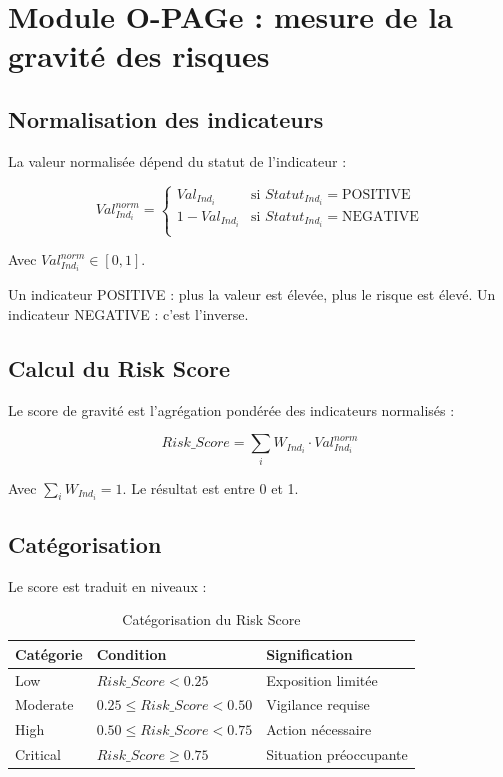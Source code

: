 \section{Module O-PAGe : mesure de la gravité des risques}

\subsection{Normalisation des indicateurs}
La valeur normalisée dépend du statut de l'indicateur :

$$
Val^{norm}_{Ind_i} = \begin{cases}
Val_{Ind_i} & \text{si } Statut_{Ind_i} = \text{POSITIVE} \\
1 - Val_{Ind_i} & \text{si } Statut_{Ind_i} = \text{NEGATIVE} \\
\end{cases}
$$

Avec $Val^{norm}_{Ind_i} \in [0, 1]$.

Un indicateur POSITIVE : plus la valeur est élevée, plus le risque est élevé. Un indicateur NEGATIVE : c'est l'inverse.

\subsection{Calcul du Risk Score}
Le score de gravité est l'agrégation pondérée des indicateurs normalisés :

$$
Risk\_Score = \sum_{i} W_{Ind_i} \cdot Val^{norm}_{Ind_i}
$$

Avec $\sum_{i} W_{Ind_i} = 1$. Le résultat est entre 0 et 1.

\subsection{Catégorisation}
Le score est traduit en niveaux :

\begin{table}[h!]
\centering
\renewcommand{\arraystretch}{1.3}
\begin{tabular}{@{}p{}p{}p{}@{}}
\hline
\textbf{Catégorie} & \textbf{Condition} & \textbf{Signification} \\
\hline
Low & $Risk\_Score < 0.25$ & Exposition limitée \\
\hline
Moderate & $0.25 \leq Risk\_Score < 0.50$ & Vigilance requise \\
\hline
High & $0.50 \leq Risk\_Score < 0.75$ & Action nécessaire \\
\hline
Critical & $Risk\_Score \geq 0.75$ & Situation préoccupante \\
\hline
\end{tabular}
\caption{Catégorisation du Risk Score}
\end{table}

